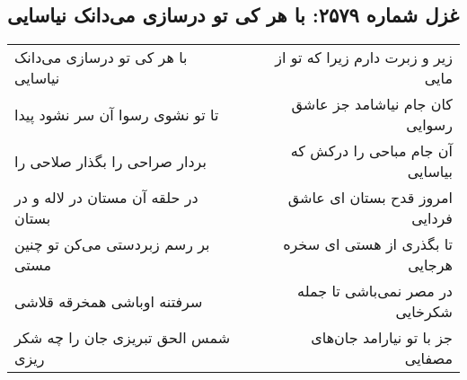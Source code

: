 \begin{center}
\section*{غزل شماره ۲۵۷۹: با هر کی تو درسازی می‌دانک نیاسایی}
\label{sec:2579}
\begin{longtable}{l p{0.5cm} r}
با هر کی تو درسازی می‌دانک نیاسایی
&&
زیر و زبرت دارم زیرا که تو از مایی
\\
تا تو نشوی رسوا آن سر نشود پیدا
&&
کان جام نیاشامد جز عاشق رسوایی
\\
بردار صراحی را بگذار صلاحی را
&&
آن جام مباحی را درکش که بیاسایی
\\
در حلقه آن مستان در لاله و در بستان
&&
امروز قدح بستان ای عاشق فردایی
\\
بر رسم زبردستی می‌کن تو چنین مستی
&&
تا بگذری از هستی ای سخره هرجایی
\\
سرفتنه اوباشی همخرقه قلاشی
&&
در مصر نمی‌باشی تا جمله شکرخایی
\\
شمس الحق تبریزی جان را چه شکر ریزی
&&
جز با تو نیارامد جان‌های مصفایی
\\
\end{longtable}
\end{center}
